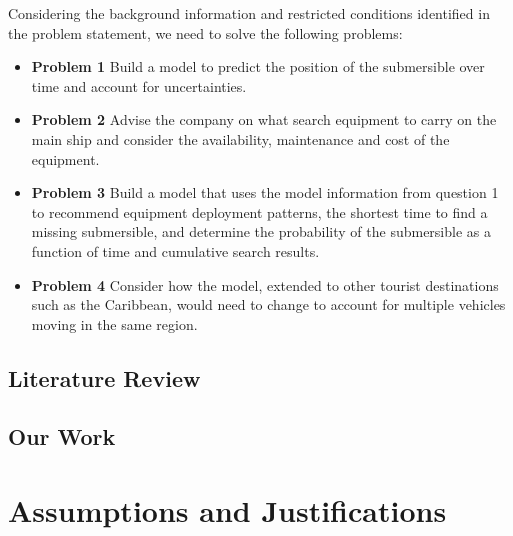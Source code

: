 \documentclass{mcmthesis}  %
\begin{document}
Considering the background information and restricted conditions identified in the problem statement, we need to solve the following problems:
\begin{itemize}  %

\item\textbf{Problem 1 }Build a model to predict the position of the submersible over time and account for uncertainties.


\item\textbf{Problem 2 }Advise the company on what search equipment to carry on the main ship and consider the availability, maintenance and cost of the equipment.

\item\textbf{Problem 3 }Build a model that uses the model information from question 1 to recommend equipment deployment patterns, the shortest time to find a missing submersible, and determine the probability of the submersible as a function of time and cumulative search results.

\item\textbf{Problem 4 }Consider how the model, extended to other tourist destinations such as the Caribbean, would need to change to account for multiple vehicles moving in the same region.
\end{itemize}  %
\subsection{Literature Review}%


\subsection{Our Work}

\section{Assumptions and Justifications}
\end{document}
